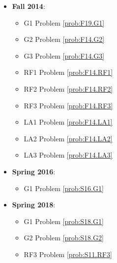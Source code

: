 \documentclass{article}
\theoremstyle{definition}
\begin{document}
\begin{itemize}
\item \textbf{Fall 2014}:  
	\begin{itemize}
	\item G1 Problem \ref{prob:F19.G1} 
	\item G2 Problem \ref{prob:F14.G2} 
	\item G3 Problem \ref{prob:F14.G3}
	\item RF1 Problem \ref{prob:F14.RF1}
	\item RF2 Problem \ref{prob:F14.RF2}
	\item RF3 Problem \ref{prob:F14.RF3}
	\item LA1 Problem \ref{prob:F14.LA1}
	\item LA2 Problem \ref{prob:F14.LA2}
	\item LA3 Problem \ref{prob:F14.LA3}
	\end{itemize}
\item \textbf{Spring 2016}:
	\begin{itemize}
		\item G1 Problem \ref{prob:S16.G1}
	\end{itemize}
\item \textbf{Spring 2018}:
	\begin{itemize}
		\item G1 Problem \ref{prob:S18.G1}
		\item G2 Problem \ref{prob:S18.G2}
		\item RF3 Problem \ref{prob:S11.RF3}
	\end{itemize}
\end{itemize}






























\end{document}

